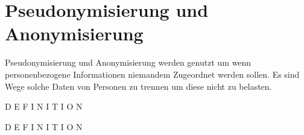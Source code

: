 \section{Pseudonymisierung und Anonymisierung}
Pseudonymisierung und Anonymisierung werden genutzt um wenn personenbezogene Informationen niemandem Zugeordnet werden sollen.
Es sind Wege solche Daten von Personen zu trennen um diese nicht zu belasten.

\begin{definition}[Pseudonymisierung]
D E F I N I T I O N
\end{definition}

\begin{definition}[Anonymisierung]
D E F I N I T I O N
\end{definition}